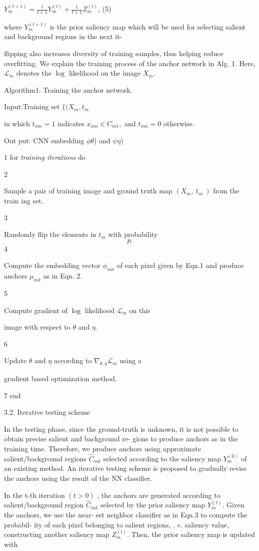 \documentclass[a4paper,10pt]{article}
\begin{document}
$Y_{m}^{(t+1)}=\displaystyle \frac{t}{t+1}Y_{m}^{(t)}+\frac{1}{t+1}Z_{m}^{(t)}$, (5)

where $Y_{m}^{(t+1)}$ is the prior saliency map which will be used for selecting salient and background regions in the next it-

flipping also increases diversity of training samples, thus helping reduce overfitting. We explain the training process of the anchor network in Alg. 1. Here, $\mathcal{L}_{m}$ denotes the $\log$ likelihood on the image $X_{m}.$

Algorithm1: Training the anchor network.

Input:Training set $\{(X_{m}, t_{m}$

in which $t_{mn}=1$ indicates $x_{mn}\in C_{m1},$ and $t_{mn}=0$ otherwise.

Out put: CN$\mathrm{N}$ embedding $\phi \theta$) and $\psi \eta$)

1 for {\it training iterations} do

2

Sample a pair of training image and ground truth map $(X_{m},\ t_{m}\ )$ from the train ing set.

3

Randomly flip the elements in $t_{m}$ with probability
$$
p.
$$
4

Compute the embedding vector $\phi_{mn}$ of each pixel given by Eqn.1 and produce anchors $\mu_{mk}$ as in Eqn. 2.

5

Compute gradient of $\log$ likelihood $\mathcal{L}_{m}$ on this

image with respect to $\theta$ and $\eta.$

6

Update $\theta$ and $\eta$ according to $\nabla_{\theta,\eta}\mathcal{L}_{m}$ using a

gradient based optimization method.

7 end

3.2. Iterative testing scheme

In the testing phase, since the ground-truth is unknown, it is not possible to obtain precise salient and background re- gions to produce anchors as in the training time. Therefore, we produce anchors using approximate salient/background regions $\hat{C}_{mk}$ selected according to the saliency map $Y_{m}^{(0)}$ of an existing method. An iterative testing scheme is proposed to gradually revise the anchors using the result of the NN classifier.

In the t-th iteration $(t>0)$ , the anchors are generated according to salient/background region $\hat{C}_{mk}$ selected by the prior saliency map $Y_{m}^{(t)}$. Given the anchors, we use the near- est neighbor classifier as in Eqn.3 to compute the probabil- ity of each pixel belonging to salient regions, . $e$. saliency value, constructing another saliency map $Z_{m}^{(t)}$. Then, the prior saliency map is updated with
\end{document}

